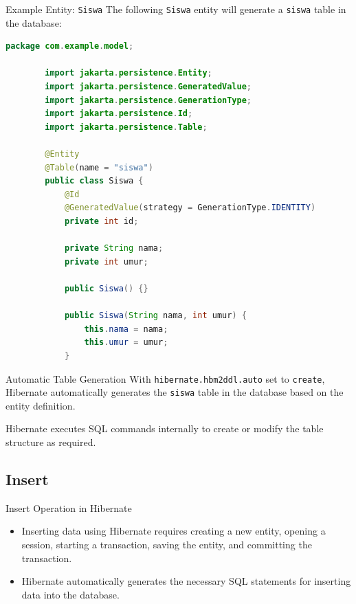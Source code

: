 \documentclass[aspectratio=169, table]{beamer}
\begin{document}
\begin{frame}[fragile]{Example Entity: \texttt{Siswa}}
	\vspace{20pt}
	The following \texttt{Siswa} entity will generate a \texttt{siswa} table in the database:
	
	\begin{lstlisting}[language=Java, style=JavaStyle]
		package com.example.model;
		
		import jakarta.persistence.Entity;
		import jakarta.persistence.GeneratedValue;
		import jakarta.persistence.GenerationType;
		import jakarta.persistence.Id;
		import jakarta.persistence.Table;
		
		@Entity
		@Table(name = "siswa")
		public class Siswa {
			@Id
			@GeneratedValue(strategy = GenerationType.IDENTITY)
			private int id;
			
			private String nama;
			private int umur;
			
			public Siswa() {}
			
			public Siswa(String nama, int umur) {
				this.nama = nama;
				this.umur = umur;
			}
		\end{lstlisting}
	\end{frame}
	
	\begin{frame}{Automatic Table Generation}
		\vspace{20pt}
		With \texttt{hibernate.hbm2ddl.auto} set to \texttt{create}, Hibernate automatically generates the \texttt{siswa} table in the database based on the entity definition.
		
		Hibernate executes SQL commands internally to create or modify the table structure as required.
	\end{frame}


\subsection{Insert}

\begin{frame}{Insert Operation in Hibernate}
	\vspace{20pt}
	\begin{itemize}
		\item Inserting data using Hibernate requires creating a new entity, opening a session, starting a transaction, saving the entity, and committing the transaction.
		\item Hibernate automatically generates the necessary SQL statements for inserting data into the database.
	\end{itemize}
\end{frame}
\end{document}
